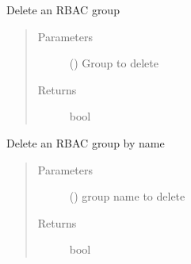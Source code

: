 \documentclass[letterpaper,10pt,english]{sphinxmanual}
\begin{document}

\begin{fulllineitems}
\label{\detokenize{rbac:rbac.core.rbac_delete_group}}
Delete an RBAC group
\begin{quote}\begin{description}
\item[{Parameters}] \leavevmode
{} ({\hyperref[\detokenize{rbac:rbac.models.RBACGroup}]{}}) \textendash{} Group to delete

\item[{Returns}] \leavevmode
bool

\end{description}\end{quote}

\end{fulllineitems}


\begin{fulllineitems}
\label{\detokenize{rbac:rbac.core.rbac_delete_group_by_name}}
Delete an RBAC group by name
\begin{quote}\begin{description}
\item[{Parameters}] \leavevmode
{} () \textendash{} group name to delete

\item[{Returns}] \leavevmode
bool

\end{description}\end{quote}

\end{fulllineitems}

\end{document}
